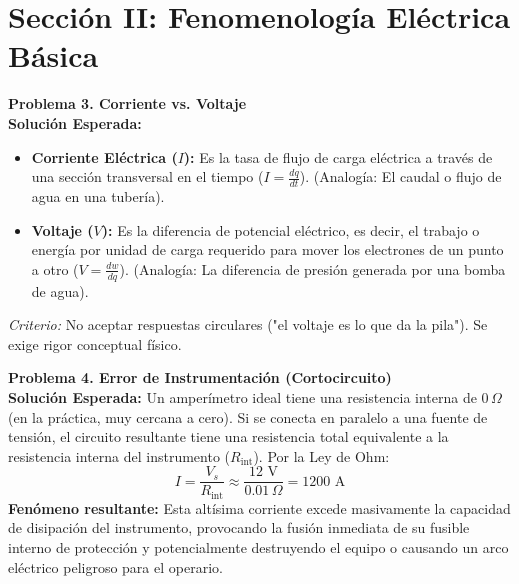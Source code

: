 \documentclass[11pt, a4paper]{article}
\begin{document}
\vspace{0.5cm}
\section*{Sección II: Fenomenología Eléctrica Básica}

\textbf{Problema 3. Corriente vs. Voltaje}
\\
\textbf{Solución Esperada:}
\begin{itemize}
    \item \textbf{Corriente Eléctrica ($I$):} Es la tasa de flujo de carga eléctrica a través de una sección transversal en el tiempo ($I = \frac{dq}{dt}$). (Analogía: El caudal o flujo de agua en una tubería).
    \item \textbf{Voltaje ($V$):} Es la diferencia de potencial eléctrico, es decir, el trabajo o energía por unidad de carga requerido para mover los electrones de un punto a otro ($V = \frac{dw}{dq}$). (Analogía: La diferencia de presión generada por una bomba de agua).
\end{itemize}
\textit{Criterio:} No aceptar respuestas circulares ("el voltaje es lo que da la pila"). Se exige rigor conceptual físico.

\vspace{0.5cm}
\textbf{Problema 4. Error de Instrumentación (Cortocircuito)}
\\
\textbf{Solución Esperada:}
Un amperímetro ideal tiene una resistencia interna de $0\,\Omega$ (en la práctica, muy cercana a cero). Si se conecta en paralelo a una fuente de tensión, el circuito resultante tiene una resistencia total equivalente a la resistencia interna del instrumento ($R_{\text{int}}$).
Por la Ley de Ohm:
\begin{equation}
    I = \frac{V_s}{R_{\text{int}}} \approx \frac{12\text{ V}}{0.01\,\Omega} = 1200\text{ A}
\end{equation}
\textbf{Fenómeno resultante:} Esta altísima corriente excede masivamente la capacidad de disipación del instrumento, provocando la fusión inmediata de su fusible interno de protección y potencialmente destruyendo el equipo o causando un arco eléctrico peligroso para el operario.
\end{document}
